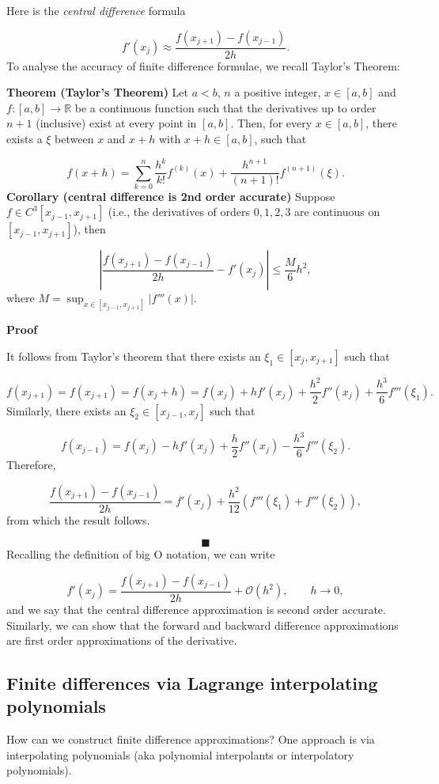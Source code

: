 \documentclass[12pt,a4paper]{article}
\begin{document}
Here is the \emph{central difference} formula

\[
f'(x_j) \approx \frac{f(x_{j+1})-f(x_{j-1})}{2h}.
\]
To analyse the accuracy of finite difference formulae, we recall Taylor's Theorem:

\textbf{Theorem (Taylor's Theorem)}  Let $a<b$, $n$ a positive integer, $x\in[a,b]$ and $f: [a,b]\to\mathbb{R}$ be a continuous function such that the derivatives up to order $n+1$ (inclusive) exist at every point in $[a,b]$. Then, for every $x\in[a,b]$, there exists a $\xi$ between $x$ and $x+h$ with $x+h\in[a,b]$, such that

\[
f(x+h)=\sum_{k=0}^{n}\frac{h^k}{k!}f^{(k)}(x)+\frac{h^{n+1}}{(n+1)!}f^{(n+1)}(\xi).
\]
\textbf{Corollary (central difference is 2nd order accurate)} Suppose $f \in C^3[x_{j-1},x_{j+1}]$ (i.e., the derivatives of orders $0, 1, 2, 3$ are continuous on $[x_{j-1},x_{j+1}]$), then 

\[
\left\vert\frac{f(x_{j+1})-f(x_{j-1})}{2h} - f'(x_j) \right\vert \leq \frac{M}{6}h^2, 
\]
where $M = \sup_{x \in [x_{j-1}, x_{j+1}]} \vert f'''(x) \vert$.

\textbf{Proof}

It follows from Taylor's theorem that there exists an $\xi_1 \in [x_{j}, x_{j+1}]$ such that 

\[
f(x_{j+ 1}) = f(x_{j + 1}) = f(x_j + h) = f(x_j) + h f'(x_j) + \frac{h^2}{2}f''(x_j) + \frac{h^3}{6}f'''(\xi_1).
\]
Similarly, there exists an $\xi_2 \in [x_{j-1}, x_{j}]$ such that 

\[
f(x_{j- 1}) = f(x_j) - h f'(x_j) + \frac{h}{2}f''(x_j) - \frac{h^3}{6}f'''(\xi_2).
\]
Therefore,

\[
\frac{f(x_{j+1})-f(x_{j-1})}{2h} = f'(x_j) + \frac{h^2}{12}\left( f'''(\xi_1) + f'''(\xi_2)   \right),
\]
from which the result follows.

\[
\blacksquare
\]
Recalling the definition of big O notation, we can write

\[
f'(x_j) = \frac{f(x_{j+1})-f(x_{j-1})}{2h} + \mathcal{O}(h^2), \qquad h \to 0,
\]
and we say that the central difference approximation is second order accurate.  Similarly, we can show that the forward and backward difference approximations are first order approximations of the derivative.

\subsection{Finite differences via Lagrange interpolating polynomials}
How can we construct finite difference approximations?  One approach is via interpolating polynomials (aka polynomial interpolants or interpolatory polynomials).
\end{document}
